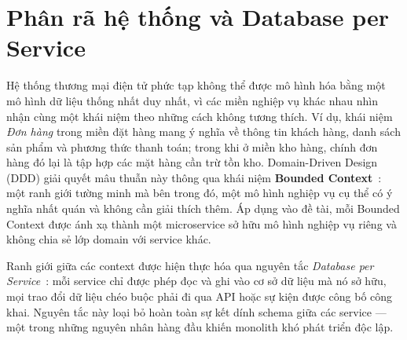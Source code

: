\documentclass[../DoAn.tex]{subfiles}
\begin{document}


\section{Phân rã hệ thống và Database per Service}
\label{section:2.2}

Hệ thống thương mại điện tử phức tạp không thể được mô hình hóa bằng một mô hình dữ liệu
thống nhất duy nhất, vì các miền nghiệp vụ khác nhau nhìn nhận cùng một khái niệm theo những
cách không tương thích. Ví dụ, khái niệm \textit{Đơn hàng} trong miền đặt hàng mang ý nghĩa
về thông tin khách hàng, danh sách sản phẩm và phương thức thanh toán; trong khi ở miền kho
hàng, chính đơn hàng đó lại là tập hợp các mặt hàng cần trừ tồn kho. Domain-Driven Design
(DDD) giải quyết mâu thuẫn này thông qua khái niệm \textbf{Bounded Context}~\cite{evans2003}:
một ranh giới tường minh mà bên trong đó, một mô hình nghiệp vụ cụ thể có ý nghĩa nhất quán
và không cần giải thích thêm. Áp dụng vào đề tài, mỗi Bounded Context được ánh xạ thành một
microservice sở hữu mô hình nghiệp vụ riêng và không chia sẻ lớp domain với service khác.

Ranh giới giữa các context được hiện thực hóa qua nguyên tắc \textit{Database per
Service}~\cite{richardson2018}: mỗi service chỉ được phép đọc và ghi vào cơ sở dữ liệu mà
nó sở hữu, mọi trao đổi dữ liệu chéo buộc phải đi qua API hoặc sự kiện được công bố công
khai. Nguyên tắc này loại bỏ hoàn toàn sự kết dính schema giữa các service --- một trong
những nguyên nhân hàng đầu khiến monolith khó phát triển độc lập.
\end{document}
